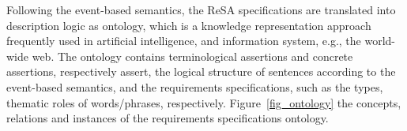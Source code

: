 Following the event-based semantics, the ReSA specifications are translated into description logic as ontology, which is a knowledge representation approach frequently used in artificial intelligence, and information system, e.g., the world-wide web. The ontology contains terminological assertions and concrete assertions, respectively assert, the logical structure of sentences according to the event-based semantics, and the requirements specifications, such as the types, thematic roles of words/phrases, respectively. Figure~\ref{fig_ontology} the concepts, relations and instances of the requirements specifications ontology.
\begin{figure}[h] 
	\centering
	 \hfill
\hfill
{}
\end{figure}
